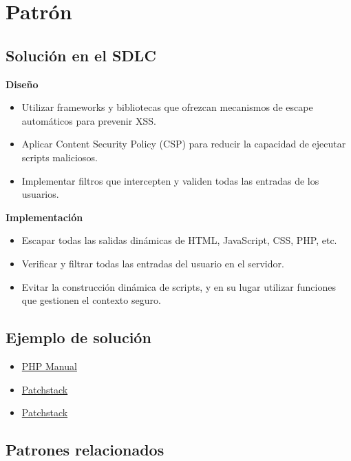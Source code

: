 \section{Patrón}

\subsection{Solución en el SDLC}
\textbf{Diseño}

\begin{itemize}
    \item Utilizar frameworks y bibliotecas que ofrezcan mecanismos de escape automáticos para prevenir XSS.
    \item Aplicar Content Security Policy (CSP) para reducir la capacidad de ejecutar scripts maliciosos.
    \item Implementar filtros que intercepten y validen todas las entradas de los usuarios.
\end{itemize}

\textbf{Implementación}

\begin{itemize}
    \item Escapar todas las salidas dinámicas de HTML, JavaScript, CSS, PHP, etc.
    \item Verificar y filtrar todas las entradas del usuario en el servidor.
    \item Evitar la construcción dinámica de scripts, y en su lugar utilizar funciones que gestionen el contexto seguro.
\end{itemize}

\subsection{Ejemplo de solución}

\begin{itemize}
    \item \href{https://www.php.net/manual/en/function.htmlspecialchars.php}{PHP Manual}
    \item \href{https://patchstack.com/academy/wordpress/securing-code/cross-site-scripting/}{Patchstack}
    \item \href{https://patchstack.com/academy/wordpress/vulnerabilities/cross-site-scripting/}{Patchstack}
\end{itemize}

\subsection{Patrones relacionados}

